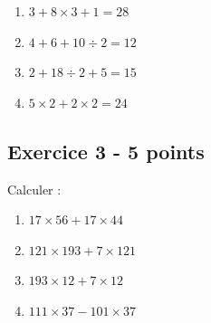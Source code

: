 \documentclass[14 pt]{extarticle}
\theoremstyle{plain}
\begin{document}
 \begin{enumerate}
 \item $3 + 8 \times 3 + 1 = 28$
 \item $4 + 6 + 10 \div 2  = 12$
 \item $2 + 18 \div 2 + 5 = 15 $
 \item $ 5 \times 2 + 2 \times 2 = 24 $
 \end{enumerate}
 

 \subsection*{Exercice 3 - 5 points} 
 
 Calculer : 
 \begin{enumerate}
 \item $17 \times 56 + 17\times 44 $
 \item $ 121 \times 193 + 7 \times 121 $
 \item $ 193 \times 12 + 7 \times 12$
 \item $ 111 \times 37 - 101 \times 37$
 \end{enumerate}
 
 
 	
\end{document}
